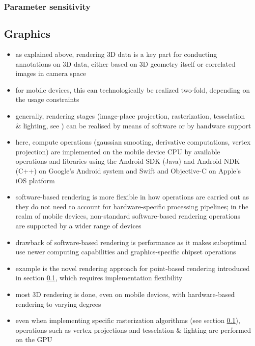 \documentclass[review]{elsarticle}
\begin{document}
\subsubsection{Parameter sensitivity}

\subsection{Graphics}

\begin{itemize}
\item as explained above, rendering 3D data is a key part for conducting annotations on 3D data, either based on 3D geometry itself or correlated images in camera space
\item for mobile devices, this can technologically be realized two-fold, depending on the usage constraints
\item generally, rendering stages (image-place projection, rasterization, tesselation \& lighting, see \cite{REDBOOK}) can be realised by means of software or by handware support
\item here, compute operations (gaussian smooting, derivative computations, vertex projection) are implemented on the mobile device CPU by available operations and libraries using the Android SDK (Java) and Android NDK (C++) on Google's Android system and Swift and Objective-C on Apple's iOS platform
\item software-based rendering is more flexible in how operations are carried out as they do not need to account for hardware-specific processing pipelines; in the realm of mobile devices, non-standard software-based rendering operations are supported by a wider range of devices
\item drawback of software-based rendering is performance as it makes suboptimal use newer computing capabilities and graphics-specific chipset operations
\item example is the novel rendering approach for point-based rendering introduced in section \ref{}, which requires implementation flexibility
\item most 3D rendering is done, even on mobile devices, with hardware-based rendering to varying degrees
\item even when implementing specific rasterization algorithms (see section \ref{}), operations such as vertex projections and tesselation \& lighting are performed on the GPU

\end{itemize}
\end{document}
